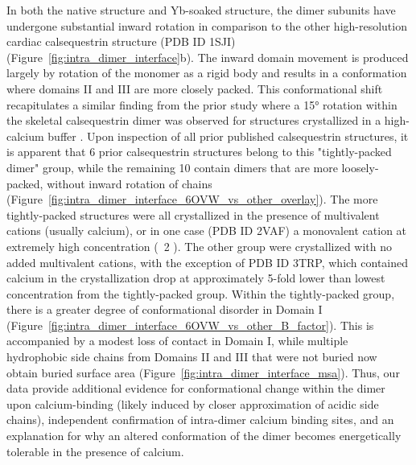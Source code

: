 In both the native structure and Yb-soaked structure, the dimer subunits have undergone substantial inward rotation in comparison to the other high-resolution cardiac calsequestrin structure (PDB ID 1SJI) (Figure~\ref{fig:intra_dimer_interface}b). The inward domain movement is produced largely by rotation of the monomer as a rigid body and results in a conformation where domains II and III are more closely packed. This conformational shift recapitulates a similar finding from the prior study where a \ang{15} rotation within the skeletal calsequestrin dimer was observed for structures crystallized in a high-calcium buffer \cite{Sanchez2012-qi}. Upon inspection of all prior published calsequestrin structures, it is apparent that 6 prior calsequestrin structures belong to this "tightly-packed dimer" group, while the remaining 10 contain dimers that are more loosely-packed, without inward rotation of chains (Figure~\ref{fig:intra_dimer_interface_6OVW_vs_other_overlay}). The more tightly-packed structures were all crystallized in the presence of multivalent cations (usually calcium), or in one case (PDB ID 2VAF) a monovalent cation at extremely high concentration (~\SI{2}{\Molar} ). The other group were crystallized with no added multivalent cations, with the exception of PDB ID 3TRP, which contained calcium in the crystallization drop at approximately 5-fold lower than lowest concentration from the tightly-packed group. Within the tightly-packed group, there is a greater degree of conformational disorder in Domain I (Figure~\ref{fig:intra_dimer_interface_6OVW_vs_other_B_factor}). This is accompanied by a modest loss of contact in Domain I, while multiple hydrophobic side chains from Domains II and III that were not buried now obtain buried surface area (Figure~\ref{fig:intra_dimer_interface_msa}). Thus, our data provide additional evidence for conformational change within the dimer upon calcium-binding (likely induced by closer approximation of acidic side chains), independent confirmation of intra-dimer calcium binding sites, and an explanation for why an altered conformation of the dimer becomes energetically tolerable in the presence of calcium. 


